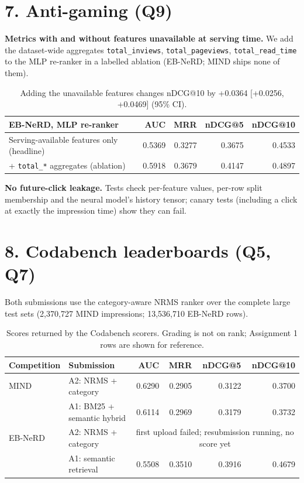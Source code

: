 \documentclass[11pt,a4paper]{article}
\begin{document}
\section*{7. Anti-gaming (Q9)}

\textbf{Metrics with and without features unavailable at serving time.} We add the dataset-wide aggregates \texttt{total\_inviews}, \texttt{total\_pageviews}, \texttt{total\_read\_time} to the MLP re-ranker in a labelled ablation (EB-NeRD; MIND ships none of them).

\begin{table}[H]
\centering\small
\begin{tabular}{lrrrr}
\toprule
\textbf{EB-NeRD, MLP re-ranker} & \textbf{AUC} & \textbf{MRR} & \textbf{nDCG@5} & \textbf{nDCG@10} \\
\midrule
Serving-available features only (headline) & 0.5369 & 0.3277 & 0.3675 & 0.4533 \\
+ \texttt{total\_*} aggregates (ablation) & 0.5918 & 0.3679 & 0.4147 & 0.4897 \\
\bottomrule
\end{tabular}
\caption{Adding the unavailable features changes nDCG@10 by +0.0364 [+0.0256, +0.0469] (95\% CI). }
\end{table}

\textbf{No future-click leakage.} Tests check per-feature values, per-row split membership and the neural model's history tensor; canary tests (including a click at exactly the impression time) show they can fail.

\section*{8. Codabench leaderboards (Q5, Q7)}

Both submissions use the category-aware NRMS ranker over the complete large test
sets (2{,}370{,}727 MIND impressions; 13{,}536{,}710 EB-NeRD rows).

\begin{table}[H]
\centering\small
\begin{tabular}{llrrrr}
\toprule
\textbf{Competition} & \textbf{Submission} & \textbf{AUC} & \textbf{MRR} & \textbf{nDCG@5} & \textbf{nDCG@10} \\
\midrule
MIND    & A2: NRMS + category          & 0.6290 & 0.2905 & 0.3122 & 0.3700 \\
        & A1: BM25 + semantic hybrid   & 0.6114 & 0.2969 & 0.3179 & 0.3732 \\
\midrule
EB-NeRD & A2: NRMS + category          & \multicolumn{4}{c}{first upload failed; resubmission running, no score yet} \\
        & A1: semantic retrieval       & 0.5508 & 0.3510 & 0.3916 & 0.4679 \\
\bottomrule
\end{tabular}
\caption{Scores returned by the Codabench scorers. Grading is not on rank; Assignment 1 rows are shown for reference.}
\end{table}
\end{document}
